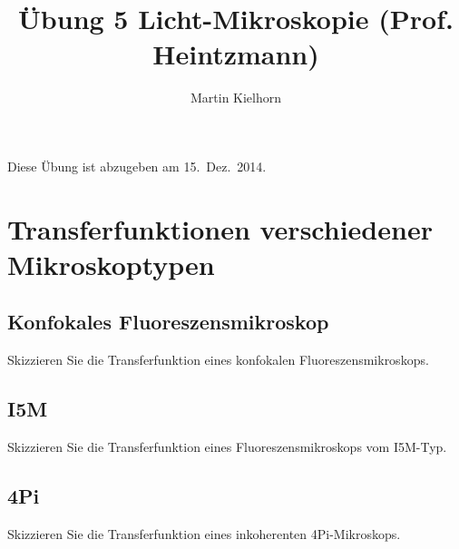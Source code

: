 \documentclass{article}
\begin{document}
\author{Martin Kielhorn}
\title{\"Ubung 5 Licht-Mikroskopie (Prof. Heintzmann)}
\maketitle
\noindent Diese \"Ubung ist abzugeben am 15.~Dez.~2014.

\section{Transferfunktionen verschiedener Mikroskoptypen}
\subsection{Konfokales Fluoreszensmikroskop}
Skizzieren Sie die Transferfunktion eines konfokalen Fluoreszensmikroskops.
\subsection{I5M}
Skizzieren Sie die Transferfunktion eines Fluoreszensmikroskops vom I5M-Typ.
\subsection{4Pi}
Skizzieren Sie die Transferfunktion eines inkoherenten 4Pi-Mikroskops.
\end{document}
